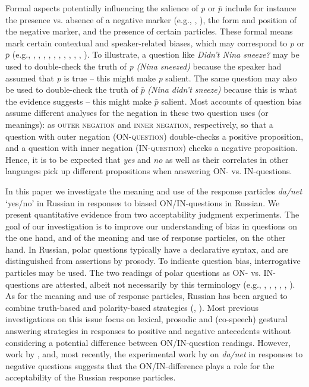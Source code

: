 \documentclass[output=paper,colorlinks,citecolor=brown]{langscibook}
\begin{document}
Formal aspects potentially influencing the salience of \textit{p} or $\bar{p}$ include for instance the presence vs. absence of a negative marker (e.g., \citealt{RoelofsenGool2010}, \citealt{RoelofsenFarkas2015}), the form and position of the negative marker, and the presence of certain particles. These formal means mark certain contextual and speaker-related biases, which may correspond to \textit{p} or $\bar{p}$ (e.g., \citealt{Ladd1981}, \citealt{BuringGunlogson2000}, \citealt{RomeroHan2004}, \citealt{Repp2009}, \citealt{Sudo2013}, \citealt{Seeliger2015}, \citeyear{Seeliger2019}, \citealt{Gyuris2017}, \citealt{SeeligerRepp2018}, \citealt{ArnholdRomero2021}, \citealt{ReppGeistToAppear}). To illustrate, a question like \textit{Didn't Nina sneeze?} may be used to double-check the truth of \textit{p} \textit{(Nina sneezed)} because the speaker had assumed that \textit{p} is true -- this might make \textit{p} salient. The same question may also be used to double-check the truth of $\bar{p}$ \textit{(Nina didn't sneeze)} because this is what the evidence suggests -- this might make $\bar{p}$ salient. Most accounts of question bias assume different analyses for the negation in these two question uses (or meanings): as \textsc{outer negation} and \textsc{inner negation}, respectively, so that a question with outer negation (\textsc{ON-question}) double-checks a positive proposition, and a question with inner negation (\textsc{IN-question}) checks a negative proposition. Hence, it is to be expected that \textit{yes} and \textit{no} as well as their correlates in other languages pick up different propositions when answering ON- vs. IN-questions. 

In this paper we investigate the meaning and use of the response particles \textit{da/net} ‘yes/no' in Russian in responses to biased ON/IN-questions in Russian. We present quantitative evidence from two acceptability judgment experiments. The goal of our investigation is to improve our understanding of bias in questions on the one hand, and of the meaning and use of response particles, on the other hand. In Russian, polar questions typically have a declarative syntax, and are distinguished from assertions by prosody. To indicate question bias, interrogative particles may be used. The two readings of polar questions as ON- vs. IN-questions are attested, albeit not necessarily by this terminology (e.g., \citealt{BaranovKobozeva1983}, \citealt{Brown.Franks1995}, \citealt{Brown1999}, \citealt[307]{Kobozeva2004}, \citealt{Meyer2004}, \citealt{Satunovskij2005}). As for the meaning and use of response particles, Russian has been argued to combine truth-based and polarity-based strategies (\citealt{Gonzalez-FuenteTubauEspinalPrieto2015}, \citealt{Esipova2021}). Most previous investigations on this issue focus on lexical, prosodic and (co-speech) gestural answering strategies in responses to positive and negative antecedents without considering a potential difference between ON/IN-question readings. However, work by \citet{Restan1972}, \citet{Meyer2004} and, most recently, the experimental work by \citet{Pancenko2021} on \textit{da/net} in responses to negative questions suggests that the ON/IN-difference plays a role for the acceptability of the Russian response particles. 
\end{document}
